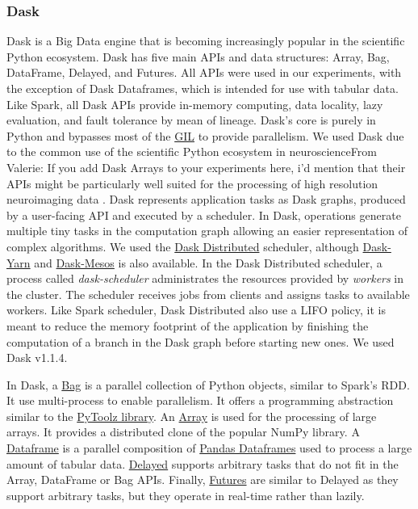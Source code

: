 \documentclass[conference]{IEEEtran}
\newcommand{\VHS}[1]{\color{green}From Valerie: #1 \color{black}}
\begin{document}
\subsubsection{Dask} Dask is a Big Data engine that is becoming increasingly popular
in the scientific Python ecosystem. Dask has five main APIs and data structures:
Array, Bag, DataFrame, Delayed, and Futures. All APIs were used in our experiments,
with the exception of Dask Dataframes, which is intended for use with tabular data.
Like Spark, all Dask APIs provide
in-memory computing, data locality, lazy evaluation, and fault tolerance by mean of
lineage. Dask's core is purely in Python and bypasses most of the
\href{https://docs.python.org/3/glossary.html#term-gil}{GIL} to provide parallelism.
We used Dask due to the common use of the scientific Python ecosystem in
neuroscience\VHS{If you add Dask Arrays to your experiments here, i'd mention that their
APIs might be particularly well suited for the processing of high resolution neuroimaging data}. Dask represents application tasks as Dask graphs, produced by a
user-facing API and executed by a scheduler. In Dask, operations generate multiple
tiny tasks in the computation graph allowing an easier representation of complex
algorithms. We used the \href{https://distributed.dask.org/en/latest/index.html}{Dask
Distributed} scheduler, although \href{https://github.com/dask/dask-yarn}{Dask-Yarn}
and \href{https://github.com/mrocklin/dask-mesos}{Dask-Mesos} is also available. In
the Dask Distributed scheduler, a process called \textit{dask-scheduler}
administrates the resources provided by \textit{workers} in the cluster. The
scheduler receives jobs from clients and assigns tasks to available workers. Like
Spark scheduler, Dask Distributed also use a LIFO policy, it is meant to reduce the
memory footprint of the application by finishing the computation of a branch in the
Dask graph before starting new ones. We used Dask v1.1.4. 

In Dask, a \href{https://docs.dask.org/en/latest/bag.html}{Bag} is a parallel
collection of Python objects, similar to Spark's RDD. It use multi-process to enable
parallelism. It offers a programming abstraction similar to the
\href{https://toolz.readthedocs.io/en/latest/}{PyToolz library}. An
\href{https://docs.dask.org/en/latest/array.html}{Array} is used for the processing
of large arrays. It provides a distributed clone of the popular NumPy library. A
\href{https://docs.dask.org/en/latest/dataframe.html}{Dataframe} is a parallel
composition of
\href{http://pandas.pydata.org/pandas-docs/stable/reference/api/pandas.DataFrame.html}{Pandas
Dataframes} used to process a large amount of tabular data.
\href{https://docs.dask.org/en/latest/delayed.html}{Delayed} supports arbitrary tasks
that do not fit in the Array, DataFrame or Bag APIs. Finally,
\href{https://docs.dask.org/en/latest/futures.html}{Futures} are similar to Delayed
as they support arbitrary tasks, but they operate in real-time rather than lazily.
\end{document}

